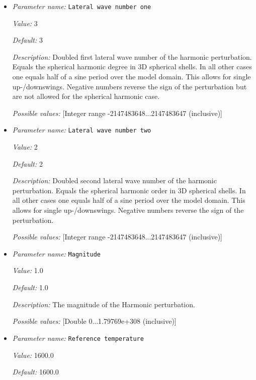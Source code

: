 \begin{itemize}
\item {\it Parameter name:} {\tt Lateral wave number one}


{\it Value:} 3


{\it Default:} 3


{\it Description:} Doubled first lateral wave number of the harmonic perturbation. Equals the spherical harmonic degree in 3D spherical shells. In all other cases one equals half of a sine period over the model domain. This allows for single up-/downswings. Negative numbers reverse the sign of the perturbation but are not allowed for the spherical harmonic case.


{\it Possible values:} [Integer range -2147483648...2147483647 (inclusive)]
\item {\it Parameter name:} {\tt Lateral wave number two}


{\it Value:} 2


{\it Default:} 2


{\it Description:} Doubled second lateral wave number of the harmonic perturbation. Equals the spherical harmonic order in 3D spherical shells. In all other cases one equals half of a sine period over the model domain. This allows for single up-/downswings. Negative numbers reverse the sign of the perturbation.


{\it Possible values:} [Integer range -2147483648...2147483647 (inclusive)]
\item {\it Parameter name:} {\tt Magnitude}


{\it Value:} 1.0


{\it Default:} 1.0


{\it Description:} The magnitude of the Harmonic perturbation.


{\it Possible values:} [Double 0...1.79769e+308 (inclusive)]
\item {\it Parameter name:} {\tt Reference temperature}


{\it Value:} 1600.0


{\it Default:} 1600.0



\end{itemize}
